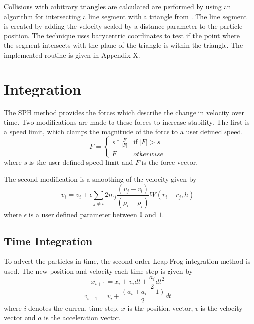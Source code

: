 Collisions with arbitrary triangles are calculated are performed by using an
algorithm for intersecting a line segment with a triangle from \cite{Ericson}. The line segment is
created by adding the velocity scaled by a distance parameter to the particle
position. The technique uses barycentric coordinates to test if the point where
the segment intersects with the plane of the triangle is within the triangle.
The implemented routine is given in Appendix X.



\section{Integration}

The SPH method provides the forces which describe the change in velocity over
time. Two modifications are made to these forces to increase stability. The
first is a speed limit, which clamps the magnitude of the force to a user defined speed.
$$
F = \begin{cases} s * \frac{F}{|F|} & \text{if $|F| > s$}
    \\
    F & \text{$otherwise$}
\end{cases}
$$
where $s$ is the user defined speed limit and $F$ is the force vector.

The second modification is a smoothing of the velocity given by
$$
v_i = v_i + \epsilon \sum_{j \ne i} 2m_j \frac{(v_j - v_i)}{(\rho_i + \rho_j)} W(r_i - r_j, h)
$$
where $\epsilon$ is a user defined parameter between $0$ and $1$.

\subsection{Time Integration}
To advect the particles in time, the second order Leap-Frog integration method
is used. The new position and velocity each time step is given by
$$
x_{i+1} = x_i + v_i dt + \frac{a_i}{2} dt^2
$$
$$
v_{i+1} = v_i + \frac{(a_i + a_i+1)}{2} dt
$$
where $i$ denotes the current time-step, $x$ is the position vector, $v$ is the velocity vector and $a$ is the acceleration vector.

